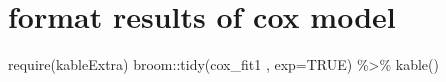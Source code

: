 \documentclass[
  11pt,
]{article}
\newenvironment{Shaded}{\begin{snugshade}}{\end{snugshade}}
\newcommand{\AttributeTok}[1]{\textcolor[rgb]{0.77,0.63,0.00}{#1}}
\newcommand{\ConstantTok}[1]{\textcolor[rgb]{0.00,0.00,0.00}{#1}}
\newcommand{\FunctionTok}[1]{\textcolor[rgb]{0.00,0.00,0.00}{#1}}
\newcommand{\NormalTok}[1]{#1}
\newcommand{\SpecialCharTok}[1]{\textcolor[rgb]{0.00,0.00,0.00}{#1}}
\begin{document}
\newpage

\hypertarget{format-results-of-cox-model}{%
\section{format results of cox
model}\label{format-results-of-cox-model}}

\begin{Shaded}
\begin{Highlighting}[]
\FunctionTok{require}\NormalTok{(kableExtra)}
\NormalTok{broom}\SpecialCharTok{::}\FunctionTok{tidy}\NormalTok{(cox\_fit1 , }
            \AttributeTok{exp=}\ConstantTok{TRUE}\NormalTok{) }\SpecialCharTok{\%\textgreater{}\%}
  \FunctionTok{kable}\NormalTok{()}
\end{Highlighting}
\end{Shaded}
\end{document}
